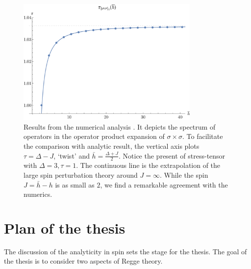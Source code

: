 \begin{figure}[t!]
  \centering
  \includegraphics[width=0.8\textwidth]{Figures/tauSigSig0.pdf}
  \caption{Results from the numerical analysis \cite{Simmons-Duffin:2016wlq}.
    It depicts the spectrum of operators in the operator product expansion of $ \sigma \times \sigma $.
    To facilitate the comparison with analytic result, the vertical axis plots $  \tau= \Delta- J $, `twist' and $ \bar{h} = \frac{\Delta + J}{2} $.
    Notice the present of stress-tensor with $ \Delta = 3 , \tau = 1$.
    The continuous line is the extrapolation of the large spin perturbation theory around $ J = \infty $.
    While the spin $ J = \bar{h} - h  $ is as small as $ 2 $, we find a remarkable agreement with the numerics.
  }
  \label{fig:DSDLightcone}
\end{figure}
\section{Plan of the thesis}
The discussion of the analyticity in spin sets the stage for the thesis.
The goal of the thesis is to consider two aspects of Regge theory.
